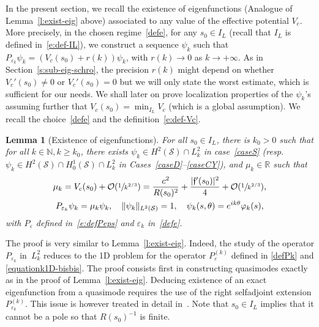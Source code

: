 \documentclass[10pt]{amsart}
\newtheorem{lemma}{Lemma}[section]
\theoremstyle{definition}
\newcommand{\calS}{\ensuremath{\mathcal S}}
\newcommand\grandon[1]{\mathcal{O}(#1)}
\newcommand{\mb}[1]{\ensuremath{\mathbb{#1}}}
\newcommand{\N}{{\mb{N}}}
\newcommand{\R}{{\mb{R}}}
\newcommand{\f}{\ensuremath{\mathfrak{f}}}
\newcommand{\ce}{c}
\let\e\varepsilon
\let\eps\varepsilon
\providecommand{\resp}{resp.}\providecommand{\cf}{cf.}
\begin{document}
In the present section, we recall the existence of eigenfunctions (Analogue of Lemma~\ref{l:exist-eig} above) associated to any value of the effective potential $V_\ce$. More precisely, in the chosen regime~\eqref{defe}, for any $s_0\in I_L$ (recall that $I_L$ is defined in~\eqref{e:def-IL}), we construct a sequence $\psi_k$ such that $P_{\e_k} \psi_k = (V_\ce(s_0) + r(k)) \psi_k$, with $r(k)\to 0$ as $k\to + \infty$. As in Section~\ref{s:sub-eig-schro}, the precision $r(k)$ might depend on whether $V_\ce'(s_0) \neq 0$ or $V_\ce'(s_0) = 0$ but we will only state the worst estimate, which is sufficient for our needs. We shall later on prove localization properties of the $\psi_k$'s assuming further that $V_c(s_0) = \min_{I_L}V_\ce$ (which is a global assumption).
We recall the choice~\eqref{defe} and the definition~\eqref{e:def-Vc}.

\begin{lemma}[Existence of eigenfunctions]
\label{l:exist-mu-psibord}
For all $s_0 \in I_L$, there is $k_0>0$ such that for all $k\in\N, k\geq k_0$, there exists $\psi_k \in H^{2}(\calS)\cap L^2_k$ in case~\ref{caseS} (\resp $\psi_k \in H^{2}(\calS)\cap H^1_0(\calS)\cap L^2_k$ in Cases~\ref{caseD}--\ref{caseCY}), and $\mu_k \in \R$ such that
\begin{gather*}
\mu_k= V_\ce(s_0) +\grandon{\sfrac{1}{k^{2/3}}}
= \frac{\ce^2}{R(s_0)^2}+\frac{|\f'(s_0)|^2}{4} + \grandon{\sfrac{1}{k^{2/3}}}, \\
P_{\e_k} \psi_k = \mu_k \psi_k, \quad \|\psi_k\|_{L^2(\calS)}=1, \quad \psi_k(s,\theta) = e^{ik\theta} \varphi_k(s),
\end{gather*}
with $P_\eps$ defined in~\eqref{e:defPeps} and $\e_k$ in~\eqref{defe}.
\end{lemma}
The proof is very similar to Lemma~\ref{l:exist-eig}. Indeed, the study of the operator $P_{\e_k}$ in~$L^{2}_{k}$ reduces to the 1D problem for the operator $P_{\e}^{(k)}$ defined in \eqref{defPk} and \eqref{equationk1D-bisbis}. The proof consists first in constructing quasimodes exactly as in the proof of Lemma~\ref{l:exist-eig}. Deducing existence of an exact eigenfunction from a quasimode requires the use of the right selfadjoint extension $P_{\e_{k}}^{(k)}$. This issue is however treated in detail in~\cite[Lem.\,3.6]{LL:18}.
Note that $s_{0} \in I_L$ implies that it cannot be a pole so that $R(s_{0})^{-1}$ is finite.
\end{document}
